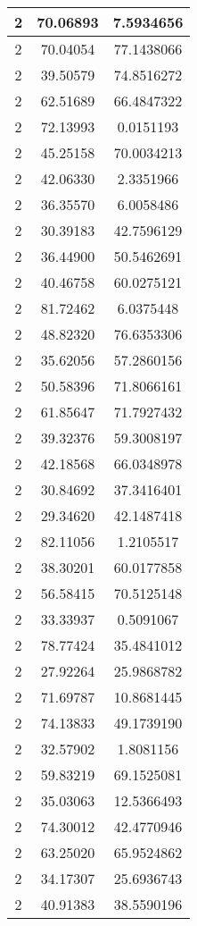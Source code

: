 \documentclass[
]{book}
\begin{document}
\begin{tabular}{c|c|c}
\hline
2 & 70.06893 & 7.5934656\\
\hline
2 & 70.04054 & 77.1438066\\
\hline
2 & 39.50579 & 74.8516272\\
\hline
2 & 62.51689 & 66.4847322\\
\hline
2 & 72.13993 & 0.0151193\\
\hline
2 & 45.25158 & 70.0034213\\
\hline
2 & 42.06330 & 2.3351966\\
\hline
2 & 36.35570 & 6.0058486\\
\hline
2 & 30.39183 & 42.7596129\\
\hline
2 & 36.44900 & 50.5462691\\
\hline
2 & 40.46758 & 60.0275121\\
\hline
2 & 81.72462 & 6.0375448\\
\hline
2 & 48.82320 & 76.6353306\\
\hline
2 & 35.62056 & 57.2860156\\
\hline
2 & 50.58396 & 71.8066161\\
\hline
2 & 61.85647 & 71.7927432\\
\hline
2 & 39.32376 & 59.3008197\\
\hline
2 & 42.18568 & 66.0348978\\
\hline
2 & 30.84692 & 37.3416401\\
\hline
2 & 29.34620 & 42.1487418\\
\hline
2 & 82.11056 & 1.2105517\\
\hline
2 & 38.30201 & 60.0177858\\
\hline
2 & 56.58415 & 70.5125148\\
\hline
2 & 33.33937 & 0.5091067\\
\hline
2 & 78.77424 & 35.4841012\\
\hline
2 & 27.92264 & 25.9868782\\
\hline
2 & 71.69787 & 10.8681445\\
\hline
2 & 74.13833 & 49.1739190\\
\hline
2 & 32.57902 & 1.8081156\\
\hline
2 & 59.83219 & 69.1525081\\
\hline
2 & 35.03063 & 12.5366493\\
\hline
2 & 74.30012 & 42.4770946\\
\hline
2 & 63.25020 & 65.9524862\\
\hline
2 & 34.17307 & 25.6936743\\
\hline
2 & 40.91383 & 38.5590196\\

\end{tabular}
\end{document}
